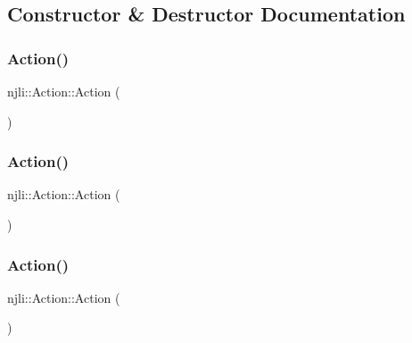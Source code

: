 \subsection{Constructor \& Destructor Documentation}
\mbox{\label{classnjli_1_1_action_a8eea8ac4abc1e39cf11326854633736b}} 
\subsubsection{\texorpdfstring{Action()}{Action()}\hspace{0.1cm}{\footnotesize\ttfamily [1/3]}}
{\footnotesize\ttfamily njli\+::\+Action\+::\+Action (\begin{DoxyParamCaption}{ }\end{DoxyParamCaption})\hspace{0.3cm}{\ttfamily [protected]}}

\mbox{\label{classnjli_1_1_action_a06624fdbd7e7d8d6b814b17106520c3c}} 
\subsubsection{\texorpdfstring{Action()}{Action()}\hspace{0.1cm}{\footnotesize\ttfamily [2/3]}}
{\footnotesize\ttfamily njli\+::\+Action\+::\+Action (\begin{DoxyParamCaption}\item[{const \mbox{\hyperlink{classnjli_1_1_abstract_builder}{Abstract\+Builder}} \&}]{ }\end{DoxyParamCaption})\hspace{0.3cm}{\ttfamily [protected]}}

\mbox{\label{classnjli_1_1_action_afc2efdef9092be597613173a32ffd6f9}} 
\subsubsection{\texorpdfstring{Action()}{Action()}\hspace{0.1cm}{\footnotesize\ttfamily [3/3]}}
{\footnotesize\ttfamily njli\+::\+Action\+::\+Action (\begin{DoxyParamCaption}\item[{const \mbox{\hyperlink{classnjli_1_1_action}{Action}} \&}]{ }\end{DoxyParamCaption})\hspace{0.3cm}{\ttfamily [protected]}}

